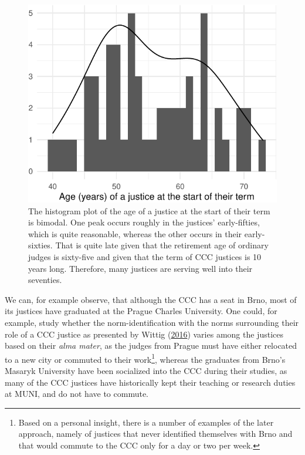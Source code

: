 \documentclass[
  11pt,
]{article}
\begin{document}
\begin{figure}
\centering
\includegraphics{ANONYMIZED_The_Czech_Constitutional_Court_Dataset_files/figure-latex/age-1.pdf}
\caption{The histogram plot of the age of a justice at the start of
their term is bimodal. One peak occurs roughly in the justices'
early-fifties, which is quite reasonable, whereas the other occurs in
their early-sixties. That is quite late given that the retirement age of
ordinary judges is sixty-five and given that the term of CCC justices is
10 years long. Therefore, many justices are serving well into their
seventies.}
\end{figure}

We can, for example observe, that although the CCC has a seat in Brno,
most of its justices have graduated at the Prague Charles University.
One could, for example, study whether the norm-identification with the
norms surrounding their role of a CCC justice as presented by Wittig
(\protect\hyperlink{ref-wittigOccurrenceSeparateOpinions2016}{2016})
varies among the justices based on their \emph{alma mater}, as the
judges from Prague must have either relocated to a new city or commuted
to their work\footnote{Based on a personal insight, there is a number of
  examples of the later approach, namely of justices that never
  identified themselves with Brno and that would commute to the CCC only
  for a day or two per week.}, whereas the graduates from Brno's Masaryk
University have been socialized into the CCC during their studies, as
many of the CCC justices have historically kept their teaching or
research duties at MUNI, and do not have to commute.
\end{document}
